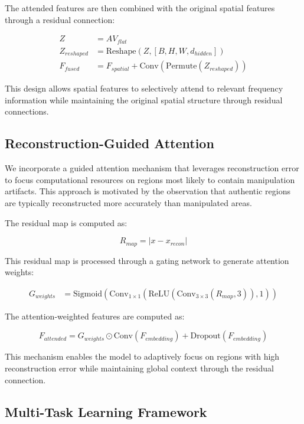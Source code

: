 \documentclass[letterpaper]{article} %
\begin{document}
The attended features are then combined with the original spatial features through a residual connection:

\begin{align}
Z &= A V_{flat} \\
Z_{reshaped} &= \text{Reshape}(Z, [B, H, W, d_{hidden}]) \\
F_{fused} &= F_{spatial} + \text{Conv}(\text{Permute}(Z_{reshaped}))
\end{align}

This design allows spatial features to selectively attend to relevant frequency information while maintaining the original spatial structure through residual connections.

\subsection{Reconstruction-Guided Attention}

We incorporate a guided attention mechanism that leverages reconstruction error to focus computational resources on regions most likely to contain manipulation artifacts. This approach is motivated by the observation that authentic regions are typically reconstructed more accurately than manipulated areas.

The residual map is computed as:

\begin{equation}
R_{map} = |x - x_{recon}|
\end{equation}

This residual map is processed through a gating network to generate attention weights:

\begin{align}
G_{weights} &= \text{Sigmoid}(\text{Conv}_{1 \times 1}(\text{ReLU}(\text{Conv}_{3 \times 3}(R_{map}, 3)), 1))
\end{align}

The attention-weighted features are computed as:

\begin{equation}
F_{attended} = G_{weights} \odot \text{Conv}(F_{embedding}) + \text{Dropout}(F_{embedding})
\end{equation}

This mechanism enables the model to adaptively focus on regions with high reconstruction error while maintaining global context through the residual connection.

\subsection{Multi-Task Learning Framework}
\end{document}
